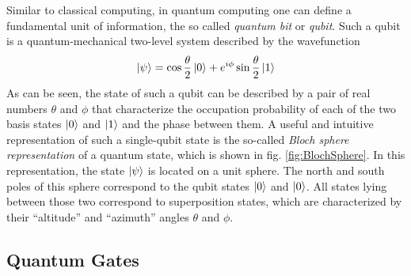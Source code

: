 Similar to classical computing, in quantum computing one can define a fundamental unit of information, the so called {\it quantum bit} or {\it qubit}. Such a qubit is a quantum-mechanical two-level system described by the wavefunction
%
\begin{equation}
\left| \psi \right> = \cos{\frac{\theta}{2}}\left| 0 \right>+e^{i\phi}\sin{\frac{\theta}{2}}\left| 1 \right>
\end{equation}
%
As can be seen, the state of such a qubit can be described by a pair of real numbers $\theta$ and $\phi$ that characterize the occupation probability of each of the two basis states $\left| 0 \right>$ and $\left| 1 \right>$ and the phase between them. A useful and intuitive representation of such a single-qubit state is the so-called {\it Bloch sphere representation} of a quantum state, which is shown in fig. \ref{fig:BlochSphere}. In this representation, the state $\left| \psi \right>$ is located on a unit sphere. The north and south poles of this sphere correspond to the qubit states $\left| 0 \right>$ and $\left| 0 \right>$. All states lying between those two correspond to superposition states, which are characterized by their ``altitude'' and ``azimuth'' angles $\theta$ and $\phi$.

\subsection{Quantum Gates}

